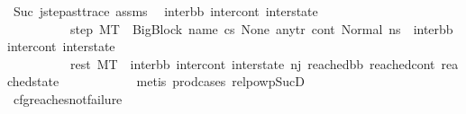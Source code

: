 \begin{isabellebody}
\ Suc\ j{\isacharunderscore}{\kern0pt}step{\isacharunderscore}{\kern0pt}ast{\isacharunderscore}{\kern0pt}trace\ assms{\isacharparenleft}{\kern0pt}{}{\isacharparenright}{\kern0pt}\ \isamarkupfalse%
\ inter{\isacharunderscore}{\kern0pt}bb\ inter{\isacharunderscore}{\kern0pt}cont\ inter{\isacharunderscore}{\kern0pt}state\ \isanewline
\ \ \ \ \ \ \ \ \ \ step{}{\isacharcolon}{\kern0pt}\ {\isachardoublequoteopen}M{\isacharcomma}{\kern0pt}{\isasymLambda}{\isacharcomma}{\kern0pt}{\isasymGamma}{\isacharcomma}{\kern0pt}{\isasymOmega}{\isacharcomma}{\kern0pt}T\ {\isasymturnstile}\ {\isasymlangle}{\isacharparenleft}{\kern0pt}{\isacharparenleft}{\kern0pt}BigBlock\ name\ cs{}\ None\ any{\isacharunderscore}{\kern0pt}tr{\isacharparenright}{\kern0pt}{\isacharcomma}{\kern0pt}\ cont{}{\isacharcomma}{\kern0pt}\ {\isacharparenleft}{\kern0pt}Normal\ ns{}{\isacharparenright}{\kern0pt}{\isacharparenright}{\kern0pt}{\isasymrangle}\ {\isasymlongrightarrow}\ {\isacharparenleft}{\kern0pt}inter{\isacharunderscore}{\kern0pt}bb{\isacharcomma}{\kern0pt}\ inter{\isacharunderscore}{\kern0pt}cont{\isacharcomma}{\kern0pt}\ inter{\isacharunderscore}{\kern0pt}state{\isacharparenright}{\kern0pt}{\isachardoublequoteclose}\ \isanewline
\ \ \ \ \ \ \ \ \ \ rest{}{\isacharcolon}{\kern0pt}\ {\isachardoublequoteopen}M{\isacharcomma}{\kern0pt}{\isasymLambda}{\isacharcomma}{\kern0pt}{\isasymGamma}{\isacharcomma}{\kern0pt}{\isasymOmega}{\isacharcomma}{\kern0pt}T\ {\isasymturnstile}\ {\isacharparenleft}{\kern0pt}inter{\isacharunderscore}{\kern0pt}bb{\isacharcomma}{\kern0pt}\ inter{\isacharunderscore}{\kern0pt}cont{\isacharcomma}{\kern0pt}\ inter{\isacharunderscore}{\kern0pt}state{\isacharparenright}{\kern0pt}\ {\isacharminus}{\kern0pt}n{\isasymlongrightarrow}{\isacharcircum}{\kern0pt}j{\isacharprime}{\kern0pt}\ {\isacharparenleft}{\kern0pt}reached{\isacharunderscore}{\kern0pt}bb{\isacharcomma}{\kern0pt}\ reached{\isacharunderscore}{\kern0pt}cont{\isacharcomma}{\kern0pt}\ reached{\isacharunderscore}{\kern0pt}state{\isacharparenright}{\kern0pt}{\isachardoublequoteclose}\isanewline
\ \ \ \ \ \ \ \ \ \ \isamarkupfalse%
\ {\isacharparenleft}{\kern0pt}metis\ prod{\isacharunderscore}{\kern0pt}cases{}\ relpowp{\isacharunderscore}{\kern0pt}Suc{\isacharunderscore}{\kern0pt}D{}{\isacharparenright}{\kern0pt}\ \isanewline
\ \ \ \ \ \ \ \ \isamarkupfalse%
\ cfg{\isacharunderscore}{\kern0pt}reaches{\isacharunderscore}{\kern0pt}not{\isacharunderscore}{\kern0pt}failure\ \isamarkupfalse%

\end{isabellebody}
